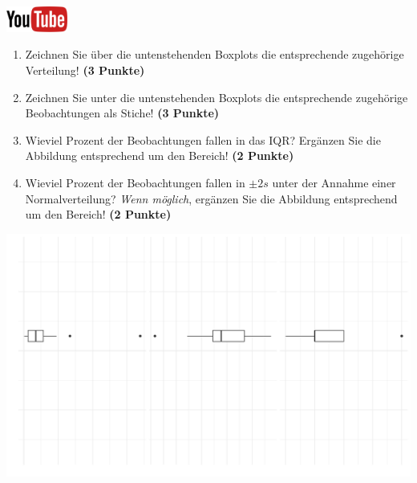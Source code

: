 \documentclass[a4paper, 9pt]{scrartcl}\usepackage[]{graphicx}\usepackage[]{xcolor}
\makeatletter
\def\maxwidth{ %
  \ifdim\Gin@nat@width>\linewidth
    \linewidth
  \else
    \Gin@nat@width
  \fi
}
\makeatother
\begin{document}
\hfill\href{https://youtu.be/Op-gjzASH9I}{\includegraphics[width =
  2cm]{img/youtube}}\\[1Ex]



\begin{enumerate}
\item Zeichnen Sie {\"u}ber die untenstehenden Boxplots die entsprechende
  zugeh{\"o}rige Verteilung! \textbf{(3 Punkte)} 
\item Zeichnen Sie unter die untenstehenden Boxplots die entsprechende
  zugeh{\"o}rige Beobachtungen als Stiche! \textbf{(3 Punkte)}
\item Wieviel Prozent der Beobachtungen fallen in das IQR? Erg{\"a}nzen Sie die
  Abbildung entsprechend um den Bereich! \textbf{(2 Punkte)}
\item Wieviel Prozent der Beobachtungen fallen in $\pm 2s$ unter
  der Annahme einer Normalverteilung?  \textit{Wenn m{\"o}glich}, erg{\"a}nzen Sie
  die Abbildung entsprechend um den Bereich! \textbf{(2 Punkte)}
\end{enumerate}




{\centering \includegraphics[width=\maxwidth]{img/desc-stat-11-1} 

}




 
\clearpage
\end{document}
